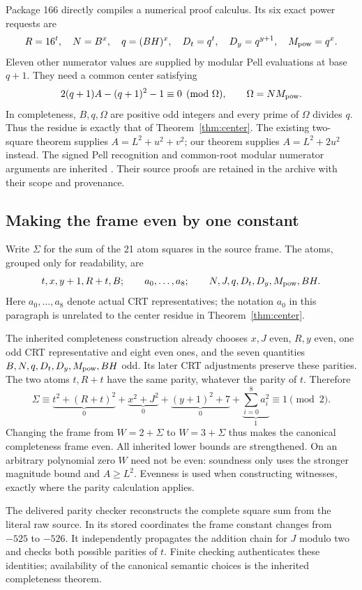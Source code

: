 \documentclass[10pt,letterpaper]{article}
\theoremstyle{definition}\newtheorem{definition}[theorem]{Definition}
\theoremstyle{remark}\newtheorem{remark}[theorem]{Remark}
\begin{document}
Package 166 directly compiles a numerical proof calculus. Its six exact
power requests are
\[
 R=16^t,\quad N=B^x,\quad q=(BH)^x,\quad
 D_t=q^t,\quad D_y=q^{y+1},\quad M_{\rm pow}=q^x.
\]
Eleven other numerator values are supplied by modular Pell evaluations
at base $q+1$. They need a common center satisfying
\[
 2(q+1)A-(q+1)^2-1\equiv0\pmod\Omega,
 \qquad \Omega=NM_{\rm pow}.
\]
In completeness, $B,q,\Omega$ are positive odd integers and every prime
of $\Omega$ divides $q$. Thus the residue is exactly that of
Theorem~\ref{thm:center}. The existing two-square theorem supplies
$A=L^2+u^2+v^2$; our theorem supplies $A=L^2+2u^2$ instead.
The signed Pell recognition and common-root modular numerator arguments
are inherited \cite{source166}. Their source proofs are retained in
the archive with their scope and provenance.

\subsection{Making the frame even by one constant}

Write $\Sigma$ for the sum of the 21 atom squares in the source frame.
The atoms, grouped only for readability, are
\[
 t,x,y+1,R+t,B;\qquad a_0,\ldots,a_8;\qquad
 N,J,q,D_t,D_y,M_{\rm pow},BH.
\]
Here $a_0,\ldots,a_8$ denote actual CRT representatives; the notation
$a_0$ in this paragraph is unrelated to the center residue in
Theorem~\ref{thm:center}.

The inherited completeness construction already chooses $x,J$ even,
$R,y$ even, one odd CRT representative and eight even ones, and the
seven quantities $B,N,q,D_t,D_y,M_{\rm pow},BH$ odd. Its later CRT
adjustments preserve these parities. The two atoms $t,R+t$ have the same
parity, whatever the parity of $t$. Therefore
\[
 \Sigma\equiv
 \underbrace{t^2+(R+t)^2}_{0}
 +\underbrace{x^2+J^2}_{0}
 +\underbrace{(y+1)^2+7}_{0}
 +\underbrace{\sum_{i=0}^8a_i^2}_{1}
 \equiv1\pmod2.
\]
Changing the frame from $W=2+\Sigma$ to $W=3+\Sigma$ thus makes
the canonical completeness frame even. All inherited lower bounds are
strengthened. On an arbitrary polynomial zero $W$ need not be even:
soundness only uses the stronger magnitude bound and $A\ge L^2$.
Evenness is used when constructing witnesses, exactly where the parity
calculation applies.

The delivered parity checker reconstructs the complete square sum from
the literal raw source. In its stored coordinates the frame constant
changes from $-525$ to $-526$. It independently propagates the addition
chain for $J$ modulo two and checks both possible parities of $t$.
Finite checking authenticates these identities; availability of the
canonical semantic choices is the inherited completeness theorem.
\end{document}
